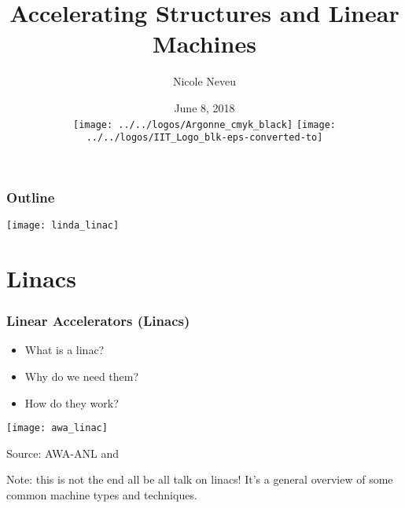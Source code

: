 \documentclass[professionalfonts,t]{beamer}
\title[USPAS 2018]{Accelerating Structures and Linear Machines}
\author[N.Neveu]{{\Large Nicole Neveu}}
\institute[ANL, IIT] %
{   Illinois Institute of Technology \\
	Argonne National Laboratory \\
    \url{nneveu@anl.gov} 
}
\date{ June 8, 2018 \\ \vspace{0.5em}
\texttt{[image: ../../logos/Argonne\_cmyk\_black]}%
\hfill \hfill \hfill%
\texttt{[image: ../../logos/IIT\_Logo\_blk-eps-converted-to]}%
}
\begin{document}
\begin{frame}
  \titlepage
\end{frame}
\begin{frame}
	\frametitle{Outline}
	\begin{minipage}{0.4\textwidth}
		\tableofcontents
	\end{minipage}\hfill
\begin{minipage}{0.5\textwidth}
	\centering
	\texttt{[image: linda\_linac]}
\end{minipage}
\end{frame}







\section{Linacs}

\begin{frame}
	\frametitle{Linear Accelerators (Linacs)}
	\vspace{1em}
	
	\begin{minipage}{0.5\textwidth}
		\begin{itemize}
			\item What is a linac?
			\item Why do we need them?
			\item How do they work?
		\end{itemize}
	\end{minipage}
\begin{minipage}{0.45\textwidth}
	\centering
	\texttt{[image: awa\_linac]}
	
	Source: AWA-ANL and 
\end{minipage}

\vspace{2em}
Note: this is not the end all be all talk on linacs!
It's a general overview of some common machine types and techniques.

\end{frame}
\end{document}

